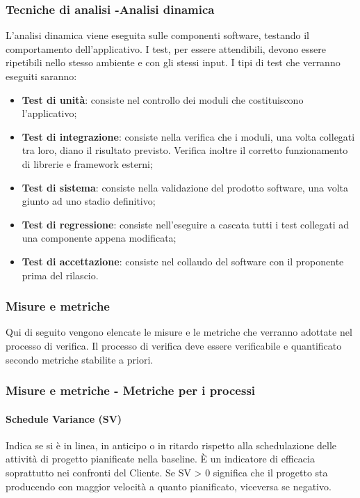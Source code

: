 \documentclass[12pt,a4paper,titlepage]{article}
\begin{document}
		\subsubsection{Tecniche di analisi -Analisi dinamica}
		L'analisi dinamica viene eseguita sulle componenti software, testando il comportamento dell'applicativo. I test, per essere attendibili, devono essere ripetibili nello stesso ambiente e con gli stessi input.
		I tipi di test che verranno eseguiti saranno:
		\begin{itemize}
			\item \textbf{Test di unità}: consiste nel controllo dei moduli che costituiscono l'applicativo;
			\item \textbf{Test di integrazione}: consiste nella verifica che i moduli, una volta collegati tra loro, diano il risultato previsto. Verifica inoltre il corretto funzionamento di librerie e framework esterni;
			\item \textbf{Test di sistema}: consiste nella validazione del prodotto software, una volta giunto ad uno stadio definitivo;
			\item \textbf{Test di regressione}: consiste nell'eseguire a cascata tutti i test collegati ad una componente appena modificata;
			\item \textbf{Test di accettazione}: consiste nel collaudo del software con il proponente prima del rilascio.
		\end{itemize}
	
	\subsubsection{Misure e metriche}
	\label{MisureMetriche}
	Qui di seguito vengono elencate le misure e le metriche che verranno adottate nel processo di verifica. Il processo di verifica deve essere verificabile e quantificato secondo metriche stabilite a priori.\\
		\subsubsection{Misure e metriche - Metriche per i processi}
			\paragraph{Schedule Variance (SV)}
			Indica se si è in linea, in anticipo o in ritardo rispetto alla schedulazione delle attività di progetto pianificate nella baseline. È un indicatore di efficacia soprattutto nei confronti del Cliente. Se SV > 0 significa che il progetto sta producendo con maggior velocità a quanto pianificato, viceversa se negativo.\\
		
\end{document}

